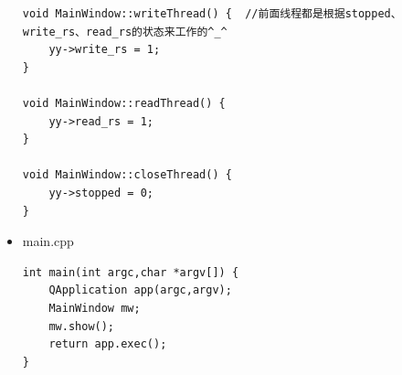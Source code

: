 \documentclass[9pt,b5paper]{article}
\begin{document}
\begin{itemize}
\begin{lstlisting}
void MainWindow::writeThread() {  //前面线程都是根据stopped、write_rs、read_rs的状态来工作的^_^      
    yy->write_rs = 1;     
}    

void MainWindow::readThread() {     
    yy->read_rs = 1;     
}     

void MainWindow::closeThread() {     
    yy->stopped = 0;     
}
\end{lstlisting}
\item main.cpp

\lstset{language=java,label= ,caption= ,numbers=none}
\begin{lstlisting}
int main(int argc,char *argv[]) {     
    QApplication app(argc,argv);     
    MainWindow mw;     
    mw.show();     
    return app.exec();     
}
\end{lstlisting}
\end{itemize}
\end{document}

